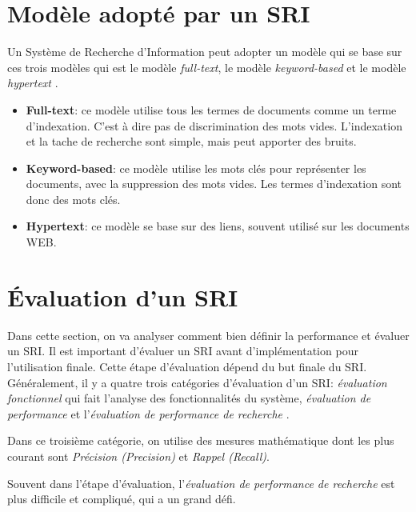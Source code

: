 \section{Modèle adopté par un SRI}
Un Système de Recherche d'Information peut adopter un modèle qui se base sur ces trois modèles qui est le modèle \textit{full-text}, le modèle \textit{keyword-based} et le modèle \textit{hypertext} \citep{modern-ir}.
\begin{itemize}
	\item \textbf{Full-text}: ce modèle utilise tous les termes de documents comme un terme d'indexation. C'est à dire pas de discrimination des mots vides. L'indexation et la tache de recherche sont simple, mais peut apporter des bruits.
	\item \textbf{Keyword-based}: ce modèle utilise les mots clés pour représenter les documents, avec la suppression des mots vides. Les termes d'indexation sont donc des mots clés.
	\item \textbf{Hypertext}: ce modèle se base sur des liens, souvent utilisé sur les documents WEB.
\end{itemize}

\section{Évaluation d'un SRI}
Dans cette section, on va analyser comment bien définir la performance et évaluer un SRI. Il est important d’évaluer un SRI avant d’implémentation pour l'utilisation finale. Cette étape d'évaluation dépend du but finale du SRI. Généralement, il y a quatre trois catégories d'évaluation d'un SRI: \textit{évaluation fonctionnel} qui fait l'analyse des fonctionnalités du système, \textit{évaluation de performance} et l'\textit{évaluation de performance de recherche} \citep{modern-ir}.

Dans ce troisième catégorie, on utilise des mesures mathématique dont les plus courant sont \textit{Précision (Precision)} et \textit{Rappel (Recall)}.

Souvent dans l'étape d'évaluation, l'\textit{évaluation de performance de recherche} est plus difficile et compliqué, qui a un grand défi.

